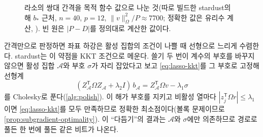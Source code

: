 \begin{figure}[htbp]
\centering
{}
\caption{라소의 쌍대 간격을 목적 함수 값으로 나눈 것(따로 빌드한 stardust의 해 $b_\ast$ 근처, $n=40$, $p=12$, $\|v\|_\Omega^2/P\approx7700$; 정확한 값은 유리수 계산, ). 빈 원은 $|P-D|$를 정의대로 계산한 값이다.}
\label{fig:lasso-gap}
\end{figure}

간격만으로 판정하면 좌표 하강은 활성 집합의 조건이 나쁠 때 선형으로 느리게 수렴한다. stardust는 이 약점을 KKT 조건으로 메운다. 쓸기 두 번이 계수의 부호를 바꾸지 않으면 활성 집합 $\mathcal A$와 부호 $\sigma$가 자리 잡았다고 보고 \cref{eq:lasso-kkt}를 그 부호로 고정해 선형계
\[
(Z_{\mathcal A}^{\mathsf T}\Omega Z_{\mathcal A}+\lambda_2I)\,b_{\mathcal A}=Z_{\mathcal A}^{\mathsf T}\Omega v-\lambda_1\sigma
\]
를 Cholesky로 푼다(\cref{alg:polish}). 이 해가 부호를 지키고 비활성 열마다 $|z_j^{\mathsf T}\Omega r|\le\lambda_1$이면 \cref{eq:lasso-kkt}를 모두 만족하므로 정확한 최소점이다(볼록 문제이므로 \cref{prop:subgradient-optimality}). 이 ``다듬기''의 결과는 $\mathcal A$와 $\sigma$에만 의존하므로 경로로 풀든 한 번에 풀든 같은 비트가 나온다.

